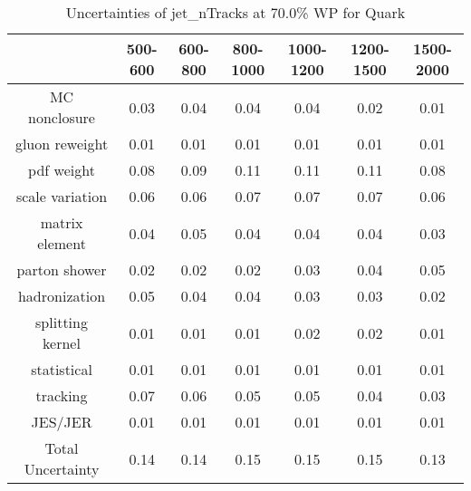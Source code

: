 \begin{table}
\centering
\caption{Uncertainties of jet_nTracks at 70.0\% WP for Quark}
\label{tab:syst_jet_nTracks_0.7_Quark}
\begin{tabular}{ccccccc}
\toprule
{} &  500-600 &  600-800 &  800-1000 &  1000-1200 &  1200-1500 &  1500-2000 \\
\midrule
MC nonclosure     &     0.03 &     0.04 &      0.04 &       0.04 &       0.02 &       0.01 \\
gluon reweight    &     0.01 &     0.01 &      0.01 &       0.01 &       0.01 &       0.01 \\
pdf weight        &     0.08 &     0.09 &      0.11 &       0.11 &       0.11 &       0.08 \\
scale variation   &     0.06 &     0.06 &      0.07 &       0.07 &       0.07 &       0.06 \\
matrix element    &     0.04 &     0.05 &      0.04 &       0.04 &       0.04 &       0.03 \\
parton shower     &     0.02 &     0.02 &      0.02 &       0.03 &       0.04 &       0.05 \\
hadronization     &     0.05 &     0.04 &      0.04 &       0.03 &       0.03 &       0.02 \\
splitting kernel  &     0.01 &     0.01 &      0.01 &       0.02 &       0.02 &       0.01 \\
statistical       &     0.01 &     0.01 &      0.01 &       0.01 &       0.01 &       0.01 \\
tracking          &     0.07 &     0.06 &      0.05 &       0.05 &       0.04 &       0.03 \\
JES/JER           &     0.01 &     0.01 &      0.01 &       0.01 &       0.01 &       0.01 \\
Total Uncertainty &     0.14 &     0.14 &      0.15 &       0.15 &       0.15 &       0.13 \\
\bottomrule
\end{tabular}
\end{table}
